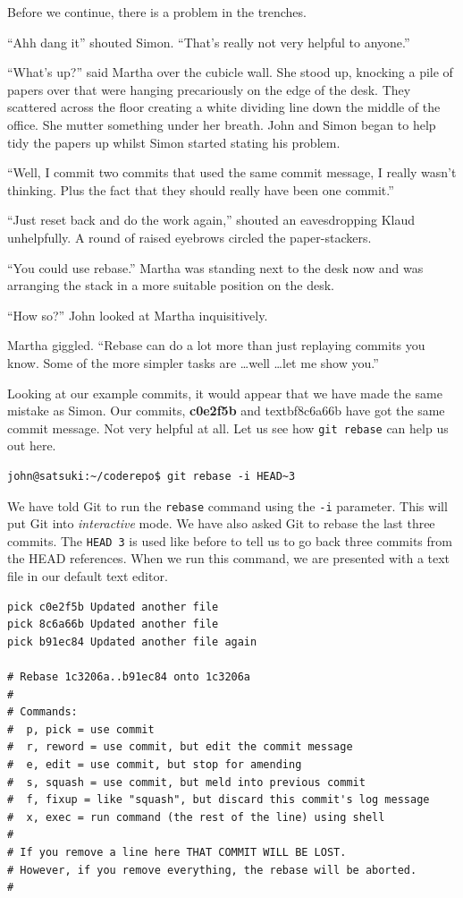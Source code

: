 Before we continue, there is a problem in the trenches.

\begin{trenches}
``Ahh dang it'' shouted Simon.
``That's really not very helpful to anyone.''

``What's up?'' said Martha over the cubicle wall.
She stood up, knocking a pile of papers over that were hanging precariously on the edge of the desk.
They scattered across the floor creating a white dividing line down the middle of the office.
She mutter something under her breath.
John and Simon began to help tidy the papers up whilst Simon started stating his problem.

``Well, I commit two commits that used the same commit message, I really wasn't thinking. Plus the fact that they should really have been one commit.''

``Just reset back and do the work again,'' shouted an eavesdropping Klaud unhelpfully.
A round of raised eyebrows circled the paper-stackers.

``You could use rebase.'' Martha was standing next to the desk now and was arranging the stack in a more suitable position on the desk.

``How so?'' John looked at Martha inquisitively.

Martha giggled.
``Rebase can do a lot more than just replaying commits you know. Some of the more simpler tasks are \ldots well \ldots let me show you.''
\end{trenches}

Looking at our example commits, it would appear that we have made the same mistake as Simon.
Our commits, \textbf{c0e2f5b} and textbf{8c6a66b} have got the same commit message.
Not very helpful at all.
Let us see how \texttt{git rebase} can help us out here.

\begin{Verbatim}
john@satsuki:~/coderepo$ git rebase -i HEAD~3
\end{Verbatim}

We have told Git to run the \texttt{rebase} command using the \texttt{-i} parameter.
This will put Git into \emph{interactive} mode.
We have also asked Git to rebase the last three commits.
The \texttt{HEAD~3} is used like before to tell us to go back three commits from the HEAD references.
When we run this command, we are presented with a text file in our default text editor.

\begin{Verbatim}
pick c0e2f5b Updated another file
pick 8c6a66b Updated another file
pick b91ec84 Updated another file again

# Rebase 1c3206a..b91ec84 onto 1c3206a
#
# Commands:
#  p, pick = use commit
#  r, reword = use commit, but edit the commit message
#  e, edit = use commit, but stop for amending
#  s, squash = use commit, but meld into previous commit
#  f, fixup = like "squash", but discard this commit's log message
#  x, exec = run command (the rest of the line) using shell
#
# If you remove a line here THAT COMMIT WILL BE LOST.
# However, if you remove everything, the rebase will be aborted.
#
\end{Verbatim}

